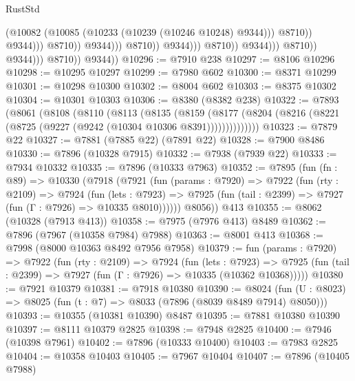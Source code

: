 \begin{lexlean}{RustStd}
\begin{coremodule}
{\begin{coremodule}
{{{{{{{{{{{{{{{{{{{{{{{{{{{{{{{{{{{{{{{{{{{{{{{{{{                                                            (@10082
                                                              (@10085
                                                                (@10233
                                                                  (@10239 (@10246 @10248) @9344)))
                                                              @8710))
                                                          @9344)))
                                                    @8710))
                                                @9344)))
                                          @8710))
                                      @9344)))
                                @8710))
                            @9344)))
                      @8710))
                  @9344)))
            @8710))
        @9344))
@10296 := @7910 @238
@10297 := @8106 @10296
@10298 := @10295 @10297
@10299 := @7980 @602
@10300 := @8371 @10299
@10301 := @10298 @10300
@10302 := @8004 @602
@10303 := @8375 @10302
@10304 := @10301 @10303
@10306 := @8380 (@8382 @238)
@10322 := @7893
    (@8061
      (@8108
        (@8110
          (@8113
            (@8135
              (@8159
                (@8177 (@8204 (@8216 (@8221 (@8725 (@9227 (@9242 (@10304 @10306 @8391))))))))))))))
@10323 := @7879 @22
@10327 := @7881 (@7885 @22) (@7891 @22)
@10328 := @7900 @8486
@10330 := @7896 (@10328 @7915)
@10332 := @7938 (@7939 @22)
@10333 := @7934 @10332
@10335 := @7896 (@10333 @7963)
@10352 := @7895
    (fun (fn : @89) =>
    @10330
      (@7918
        (@7921
          (fun (params : @7920) =>
          @7922
            (fun (rty : @2109) =>
            @7924
              (fun (lets : @7923) =>
              @7925 (fun (tail : @2399) => @7927 (fun (Γ : @7926) => @10335 @8010))))))
        @8056))
    @413
@10355 := @8062 (@10328 (@7913 @413))
@10358 := @7975 (@7976 @413) @8489
@10362 := @7896 (@7967 (@10358 @7984) @7988)
@10363 := @8001 @413
@10368 := @7998 (@8000 @10363 @8492 @7956 @7958)
@10379 := fun (params : @7920) =>
  @7922
    (fun (rty : @2109) =>
    @7924
      (fun (lets : @7923) =>
      @7925 (fun (tail : @2399) => @7927 (fun (Γ : @7926) => @10335 (@10362 @10368)))))
@10380 := @7921 @10379
@10381 := @7918 @10380
@10390 := @8024 (fun (U : @8023) => @8025 (fun (t : @7) => @8033 (@7896 (@8039 @8489 @7914) @8050)))
@10393 := @10355 (@10381 @10390) @8487
@10395 := @7881 @10380 @10390
@10397 := @8111 @10379 @2825
@10398 := @7948 @2825
@10400 := @7946 (@10398 @7961)
@10402 := @7896 (@10333 @10400)
@10403 := @7983 @2825
@10404 := @10358 @10403
@10405 := @7967 @10404
@10407 := @7896 (@10405 @7988)
}}}}}}}}}}}}}}}}}}}}}}}}}}}}}}}}}}}}}}}}}}}}}}}}}}
\end{coremodule}}
\end{coremodule}
\end{lexlean}
